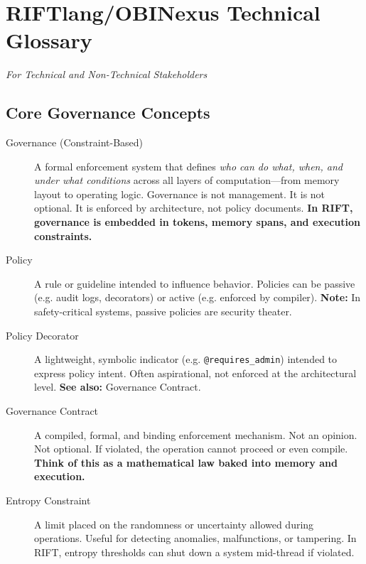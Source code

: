 
\section*{RIFTlang/OBINexus Technical Glossary}

\textit{For Technical and Non-Technical Stakeholders}

\subsection*{Core Governance Concepts}

\begin{description}
\item[Governance (Constraint-Based)] A formal enforcement system that defines \textit{who can do what, when, and under what conditions} across all layers of computation—from memory layout to operating logic. Governance is not management. It is not optional. It is enforced by architecture, not policy documents. \textbf{In RIFT, governance is embedded in tokens, memory spans, and execution constraints.}

\item[Policy] A rule or guideline intended to influence behavior. Policies can be passive (e.g. audit logs, decorators) or active (e.g. enforced by compiler). \textbf{Note:} In safety-critical systems, passive policies are security theater.

\item[Policy Decorator] A lightweight, symbolic indicator (e.g. \texttt{@requires\_admin}) intended to express policy intent. Often aspirational, not enforced at the architectural level. \textbf{See also:} Governance Contract.

\item[Governance Contract] A compiled, formal, and binding enforcement mechanism. Not an opinion. Not optional. If violated, the operation cannot proceed or even compile. \textbf{Think of this as a mathematical law baked into memory and execution.}

\item[Entropy Constraint] A limit placed on the randomness or uncertainty allowed during operations. Useful for detecting anomalies, malfunctions, or tampering. In RIFT, entropy thresholds can shut down a system mid-thread if violated.
\end{description}

